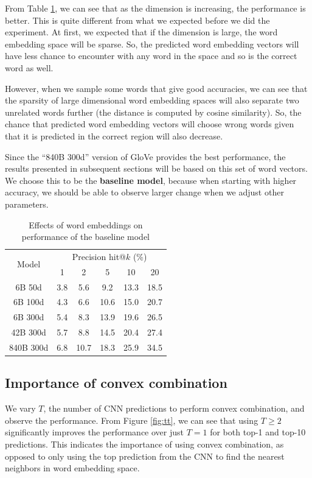 \documentclass[11pt,letterpaper]{article}
\begin{document}
From Table \ref{tab:wordemb}, we can see that as the dimension is increasing, the performance is better. This is quite different from what we expected before we did the experiment. At first, we expected that if the dimension is large, the word embedding space will be sparse. So, the predicted word embedding vectors will have less chance to encounter with any word in the space and so is the correct word as well. 

However, when we sample some words that give good accuracies, we can see that the sparsity of large dimensional word embedding spaces will also separate two unrelated words further (the distance is computed by cosine similarity). So, the chance that predicted word embedding vectors will choose wrong words given that it is predicted in the correct region will also decrease. %

Since the ``840B 300d'' version of GloVe provides the best performance, the results presented in subsequent sections will be based on this set of word vectors. We choose this to be the \textbf{baseline model}, because when starting with higher accuracy, we should be able to observe larger change when we adjust other parameters.

\begin{table}[t]
\caption{Effects of word embeddings on performance of the baseline model}
\label{tab:wordemb}
\begin{center}
\begin{small}
\begin{tabular}{cccccc}
\toprule
\multirow{2}{*}{Model} & \multicolumn{5}{c}{Precision hit@$k$ (\%)} \\
\cmidrule(lr){2-6}
& 1 & 2 & 5 & 10 & 20 \\
\midrule
6B 50d    & 3.8 & 5.6 & 9.2 & 13.3 & 18.5  \\
6B 100d   & 4.3 & 6.6 & 10.6 & 15.0 & 20.7  \\
6B 300d   & 5.4 & 8.3 & 13.9 & 19.6 & 26.5  \\
42B 300d  & 5.7 & 8.8 & 14.5 & 20.4 & 27.4  \\
840B 300d & 6.8 & 10.7 & 18.3 & 25.9 & 34.5  \\
\bottomrule
\end{tabular}
\end{small}
\end{center}
\end{table}

\subsection{Importance of convex combination}
We vary $T$, the number of CNN predictions to perform convex combination, and observe the performance. From Figure \ref{fig:tt}, we can see that using $T \geq 2$ significantly improves the performance over just $T = 1$ for both top-1 and top-10 predictions. This indicates the importance of using convex combination, as opposed to only using the top prediction from the CNN to find the nearest neighbors in word embedding space. 
\end{document}
